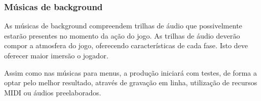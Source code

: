 \subsubsection{Músicas de background}
As músicas de background compreendem trilhas de áudio que possivelmente
 estarão presentes no momento da ação do jogo. As trilhas de áudio 
deverão compor a atmosfera do jogo, oferecendo características de 
cada fase. Isto deve oferecer maior imersão o jogador.

Assim como nas músicas para menus, a produção iniciará com testes, de 
forma a optar pelo melhor resultado, através de gravação em linha,
 utilização de recursos MIDI ou áudios preelaborados.
